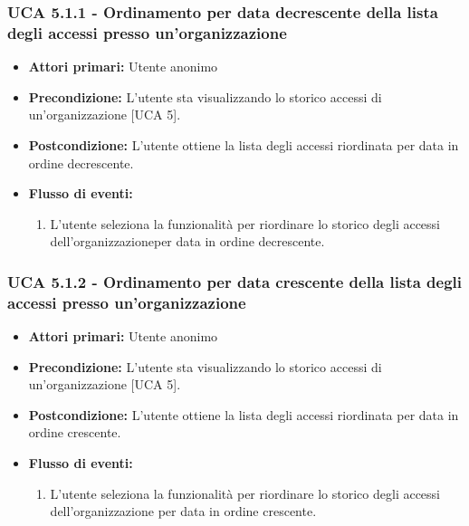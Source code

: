\subsubsection{UCA 5.1.1 - Ordinamento per data decrescente della lista degli accessi presso un'organizzazione}
\begin{itemize}
	\item \textbf{Attori primari:} Utente anonimo
	\item \textbf{Precondizione:} L'utente sta visualizzando lo storico accessi di un'organizzazione [UCA 5].
	\item \textbf{Postcondizione:} L'utente ottiene la lista degli accessi riordinata per data in ordine decrescente.
	\item \textbf{Flusso di eventi:}
	\begin{enumerate}
		\item L'utente seleziona la funzionalità per riordinare lo storico degli accessi dell'organizzazioneper data in ordine decrescente.
	\end{enumerate}   
\end{itemize}

\subsubsection{UCA 5.1.2 - Ordinamento per data crescente della lista degli accessi presso un'organizzazione}
\begin{itemize}
	\item \textbf{Attori primari:} Utente anonimo
	\item \textbf{Precondizione:} L'utente sta visualizzando lo storico accessi di un'organizzazione [UCA 5].
	\item \textbf{Postcondizione:} L'utente ottiene la lista degli accessi riordinata per data in ordine crescente.
	\item \textbf{Flusso di eventi:}
	\begin{enumerate}
		\item L'utente seleziona la funzionalità per riordinare lo storico degli accessi dell'organizzazione per data in ordine crescente.
	\end{enumerate}
\end{itemize}

